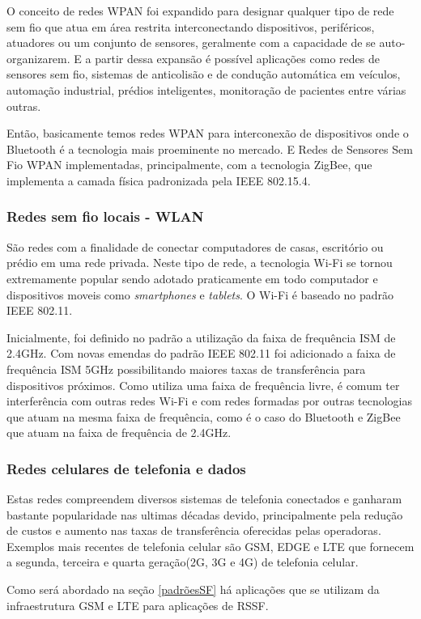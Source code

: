 O conceito de redes WPAN foi expandido para designar qualquer tipo de rede sem fio que atua em área restrita interconectando dispositivos, periféricos, atuadores ou um conjunto de sensores, geralmente com a capacidade de se auto-organizarem. E a partir dessa expansão é possível aplicações como redes de sensores sem fio, sistemas de anticolisão e de condução automática em veículos, automação industrial, prédios inteligentes, monitoração de pacientes entre várias outras.

Então, basicamente temos redes WPAN para interconexão de dispositivos onde o Bluetooth é a tecnologia mais proeminente no mercado. E Redes de Sensores Sem Fio WPAN implementadas, principalmente, com a tecnologia ZigBee, que implementa a camada física padronizada pela IEEE 802.15.4.


\subsubsection*{Redes sem fio locais - WLAN}
São redes com a finalidade de conectar computadores de casas, escritório ou prédio em uma rede privada. Neste tipo de rede, a tecnologia Wi-Fi se tornou extremamente popular sendo adotado praticamente em todo computador e dispositivos moveis como \emph{smartphones} e \emph{tablets}. O Wi-Fi é baseado no padrão IEEE 802.11.

Inicialmente, foi definido no padrão a utilização da faixa de frequência ISM de 2.4GHz. Com novas emendas do padrão IEEE 802.11 foi adicionado a faixa de frequência ISM 5GHz possibilitando maiores taxas de transferência para dispositivos próximos. Como utiliza uma faixa de frequência livre, é comum ter interferência com outras redes Wi-Fi e com redes formadas por outras tecnologias que atuam na mesma faixa de frequência, como é o caso do Bluetooth e ZigBee que atuam na faixa de frequência de 2.4GHz.

\subsubsection*{Redes celulares de telefonia e dados}
Estas redes compreendem diversos sistemas de telefonia conectados e ganharam bastante popularidade nas ultimas décadas devido, principalmente pela redução de custos e aumento nas taxas de transferência oferecidas pelas operadoras. Exemplos mais recentes de telefonia celular são GSM, EDGE e LTE que fornecem a segunda, terceira e quarta geração(2G, 3G e 4G) de telefonia celular.

Como será abordado na seção \ref{padrõesSF} há aplicações que se utilizam da infraestrutura GSM e LTE para aplicações de RSSF.


